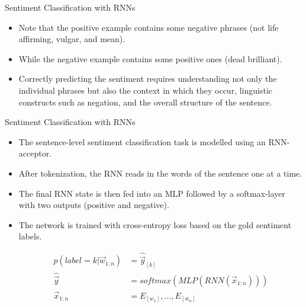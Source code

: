 \documentclass[handout]{beamer}
\begin{document}
\begin{frame}{Sentiment Classification with RNNs}
\begin{scriptsize}
\begin{itemize}
\item Note that the positive example contains some negative phrases (not life affirming, vulgar, and mean).
\item While the negative example contains some positive ones (dead brilliant).
\item Correctly predicting the sentiment requires understanding not only the individual phrases but also the context in which they occur, linguistic constructs such as negation, and the overall structure of the sentence.
\end{itemize}
\end{scriptsize}
\end{frame}

\begin{frame}{Sentiment Classification with RNNs}
\begin{scriptsize}
\begin{itemize}
\item The sentence-level sentiment classification task is modelled using an RNN-acceptor.
\item After tokenization, the RNN reads in the words of the sentence one at a time. 
\item The final RNN state is then fed into an MLP followed by a softmax-layer with two outputs (positive and negative). 
\item The network is trained with cross-entropy loss based on the gold sentiment labels.

\begin{equation}
\begin{split}
p(label = k | \vec{w}_{1:n}) & = \hat{\vec{y}}_{[k]} \\
\hat{\vec{y}} & = softmax(MLP(RNN(\vec{x}_{1:n}))) \\
\vec{x}_{1:n} & = E_{[w_{1}]}, \dots, E_{[w_{n}]} 
\end{split}
\end{equation}

\end{itemize}
\end{scriptsize}
\end{frame}
\end{document}
